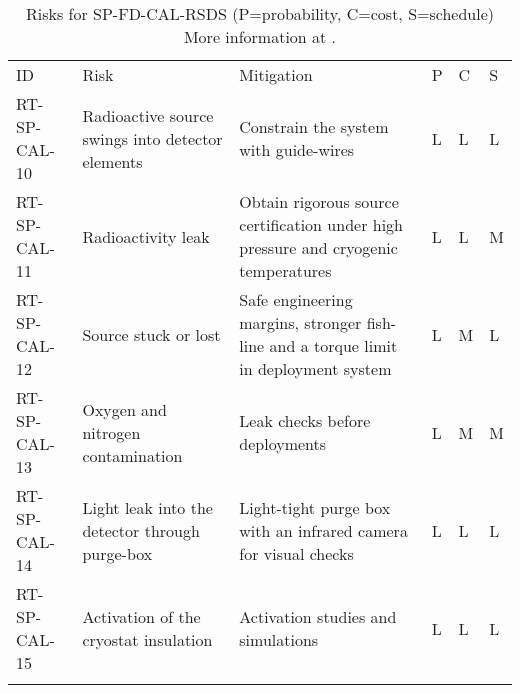 
\begin{footnotesize}
\begin{longtable}{x{0.18\textwidth}x{0.20\textwidth}x{0.32\textwidth}x{0.02\textwidth}x{0.02\textwidth}x{0.02\textwidth}} 
\caption[Risks for SP-FD-CAL-RSDS]{Risks for SP-FD-CAL-RSDS (P=probability, C=cost, S=schedule) More information at . } \\
ID & Risk & Mitigation & P & C & S  \\  \colhline
RT-SP-CAL-10 & Radioactive source swings into detector elements & Constrain the system with guide-wires & L & L & L \\  \colhline
RT-SP-CAL-11 & Radioactivity leak & Obtain rigorous source certification under high pressure and cryogenic temperatures & L & L & M \\  \colhline
RT-SP-CAL-12 & Source stuck or lost & Safe engineering margins, stronger fish-line and a torque limit in deployment system & L & M & L \\  \colhline
RT-SP-CAL-13 & Oxygen and nitrogen contamination & Leak checks before deployments & L & M & M \\  \colhline
RT-SP-CAL-14 & Light leak into the detector through purge-box & Light-tight purge box with an infrared camera for visual checks & L & L & L \\  \colhline
RT-SP-CAL-15 & Activation of the cryostat insulation & Activation studies and simulations & L & L & L \\  \colhline

\label{tab:risks:SP-FD-CAL-RSDS}
\end{longtable}
\end{footnotesize}
